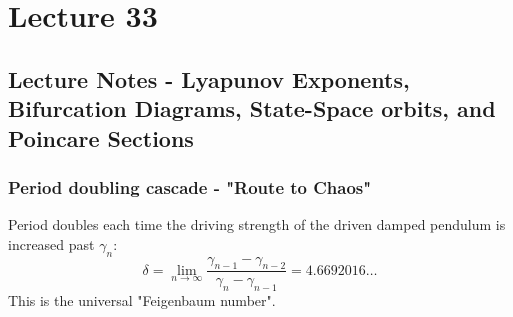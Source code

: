 \section{Lecture 33}
\subsection{Lecture Notes - Lyapunov Exponents, Bifurcation Diagrams, State-Space orbits, and Poincare Sections}
\subsubsection{Period doubling cascade - "Route to Chaos"}
Period doubles each time the driving strength of the driven damped pendulum is increased past $\gamma_n$:
\[\delta = \lim_{n\rightarrow\infty}\frac{\gamma_{n-1} - \gamma_{n-2}}{\gamma_n - \gamma_{n-1}} = 4.6692016\ldots\]
This is the universal "Feigenbaum number".
